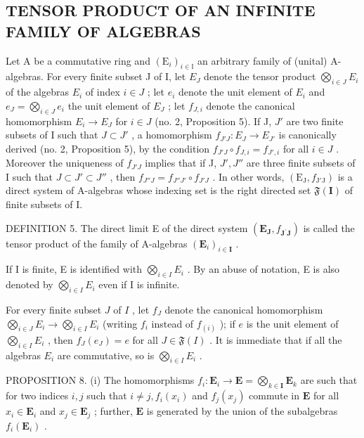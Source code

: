 \subsection{TENSOR PRODUCT OF AN INFINITE FAMILY OF ALGEBRAS}

Let A be a commutative ring and \((\mathrm{E}_{i})_{i\in\mathbb{I}}\) an arbitrary family of (unital) A-algebras. For every finite subset J of I, let \(E_{J}\) denote the tensor product \(\bigotimes_{i\in J}E_{i}\) of the algebras \(E_{i}\) of index \(i\in J\) ; let \(e_{i}\) denote the unit element of \(E_{i}\) and \(e_{J}=\bigotimes_{i\in J}e_{i}\) the unit element of \(E_{J}\) ; let \(f_{J,i}\) denote the canonical homomorphism \(E_{i}\to E_{J}\) for \(i\in J\) (no. 2, Proposition 5). If J, \(J'\) are two finite subsets of I such that \(J\subset J'\) , a homomorphism \(f_{J'J}:E_{J}\to E_{J'}\) is canonically derived (no. 2, Proposition 5), by the condition \(f_{J'J}\circ f_{J,i}=f_{J',i}\) for all \(i\in J\) . Moreover the uniqueness of \(f_{J'J}\) implies that if J, \(J',J''\) are three finite subsets of I such that \(J\subset J'\subset J''\) , then \(f_{J''J}=f_{J''J'}\circ f_{J'J}\) . In other words, \((\mathrm{E}_{\mathrm{J}},f_{\mathrm{J}'\mathrm{J}})\) is a direct system of A-algebras whose indexing set is the right directed set \(\mathfrak{F}(\mathbf{I})\) of finite subsets of I.

DEFINITION 5. The direct limit E of the direct system \((\mathbf{E}_{\mathbf{J}}, f_{\mathbf{J}^{\prime}\mathbf{J}})\) is called the tensor product of the family of A-algebras \((\mathbf{E}_i)_{i \in \mathbf{I}}\) .

If I is finite, E is identified with \(\bigotimes_{i\in I}E_i\) . By an abuse of notation, E is also denoted by \(\bigotimes_{i\in I}E_i\) even if I is infinite.

For every finite subset \(J\) of \(I\) , let \(f_{J}\) denote the canonical homomorphism \(\bigotimes_{i \in J} E_{i} \to \bigotimes_{i \in I} E_{i}\) (writing \(f_{i}\) instead of \(f_{(i)}\) ); if \(e\) is the unit element of \(\bigotimes_{i \in I} E_{i}\) , then \(f_{J}(e_{J}) = e\) for all \(J \in \mathfrak{F}(I)\) . It is immediate that if all the algebras \(E_{i}\) are commutative, so is \(\bigotimes_{i \in I} E_{i}\) .

PROPOSITION 8. (i) The homomorphisms \(f_{i} \colon \mathbf{E}_{i} \to \mathbf{E} = \bigotimes_{k \in \mathbf{I}} \mathbf{E}_{k}\) are such that for two indices \(i, j\) such that \(i \neq j, f_{i}(x_{i})\) and \(f_{j}(x_{j})\) commute in \(\mathbf{E}\) for all \(x_{i} \in \mathbf{E}_{i}\) and \(x_{j} \in \mathbf{E}_{j}\) ; further, \(\mathbf{E}\) is generated by the union of the subalgebras \(f_{i}(\mathbf{E}_{i})\) .

